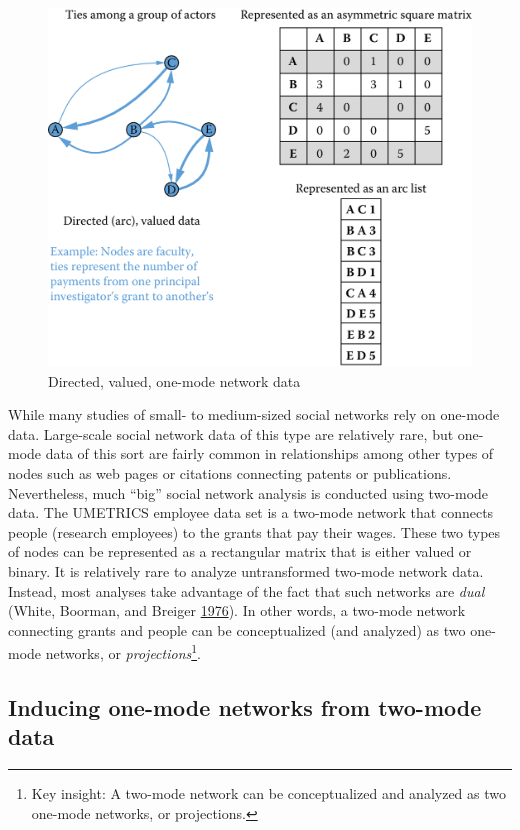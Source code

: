 \documentclass[]{krantz}
\begin{document}
\begin{figure}

{\centering \includegraphics[width=0.7\linewidth]{ChapterNetworks/figures/fig8-2} 

}

\caption{Directed, valued, one-mode network data}\label{fig:fig8-2}
\end{figure}

While many studies of small- to medium-sized social networks rely on
one-mode data. Large-scale social network data of this type are
relatively rare, but one-mode data of this sort are fairly common in
relationships among other types of nodes such as web pages or citations
connecting patents or publications. Nevertheless, much ``big'' social
network analysis is conducted using two-mode data. The UMETRICS employee
data set is a two-mode network that connects people (research employees)
to the grants that pay their wages. These two types of nodes can be
represented as a rectangular matrix that is either valued or binary. It
is relatively rare to analyze untransformed two-mode network data.
Instead, most analyses take advantage of the fact that such networks are
\emph{dual} (White, Boorman, and Breiger
\protect\hyperlink{ref-white1976social}{1976}). In other words, a
two-mode network connecting grants and people can be conceptualized (and
analyzed) as two one-mode networks, or \emph{projections}\footnote{Key
  insight: A two-mode network can be conceptualized and analyzed as two
  one-mode networks, or projections.}.

\subsection{Inducing one-mode networks from two-mode
data}\label{inducing-one-mode-networks-from-two-mode-data}
\end{document}
